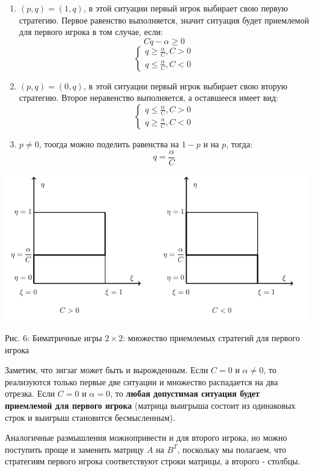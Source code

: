 \documentclass[aps,%
12pt,%
final,%
oneside,
onecolumn,%
musixtex, %
superscriptaddress,%
centertags]{article} %
\theoremstyle{plain}
\theoremstyle{definition}
\theoremstyle{remark}
\begin{document}
\begin{enumerate}
  \item $(p,q)=(1,q)$, в этой ситуации первый игрок выбирает свою первую стратегию. Первое равенство выполняется, значит ситуация будет приемлемой для первого игрока в том случае, если:
  $$Cq-\alpha \geq 0 $$
  $$\begin{cases}
    q \geq \frac{\alpha}{C}, C>0 \\
    q \leq \frac{\alpha}{C}, C<0
  \end{cases}$$

  \item $(p,q) = (0,q)$, в этой ситуации первый игрок выбирает свою вторую стратегию. Второе неравенство выполняется, а оставшееся имеет вид:
  $$\begin{cases}
    q \leq \frac{\alpha}{C} , C > 0\\
    q \geq \frac{\alpha}{C}, C < 0 
  \end{cases}$$

  \item $p \neq 0$, тоогда можно поделить равенства на $1-p$ и на $p$, тогда:
  $$q = \frac{\alpha}{C}$$
\end{enumerate}

\begin{center}
  \includegraphics[scale=0.6]{images/6.png}

  Рис. 6: Биматричные игры $2\times2$: множество приемлемых стратегий для первого игрока
\end{center}

Заметим, что зигзаг может быть и вырожденным. Если $C=0$ и $\alpha \neq 0$, то реализуются только первые две ситуации и множество распадается на два отрезка. Если $C=0$ и $\alpha=0$, то \textbf{любая допустимая ситуация будет приемлемой для первого игрока} (матрица выигрыша состоит из одинаковых строк и выигрыш становится бесмысленным).

Аналогичные размышления можнопривести и для второго игрока, но можно поступить проще и заменить матрицу $A$ на $B^T$, поскольку мы полагаем, что стратегиям первого игрока соответствуют строки матрицы, а второго - столбцы.
\end{document}
